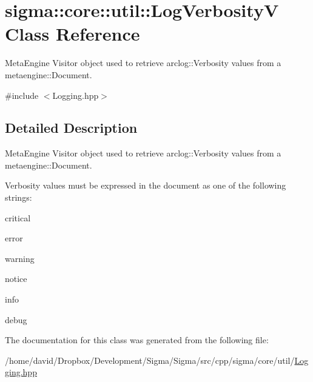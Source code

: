 \hypertarget{classsigma_1_1core_1_1util_1_1_log_verbosity_v}{\section{sigma\-:\-:core\-:\-:util\-:\-:Log\-Verbosity\-V Class Reference}
\label{classsigma_1_1core_1_1util_1_1_log_verbosity_v}
}


Meta\-Engine Visitor object used to retrieve arclog\-::\-Verbosity values from a metaengine\-::\-Document.  




{\ttfamily \#include $<$Logging.\-hpp$>$}



\subsection{Detailed Description}
Meta\-Engine Visitor object used to retrieve arclog\-::\-Verbosity values from a metaengine\-::\-Document. 

Verbosity values must be expressed in the document as one of the following strings\-:


\begin{DoxyItemize}
\item critical
\item error
\item warning
\item notice
\item info
\item debug 
\end{DoxyItemize}

The documentation for this class was generated from the following file\-:\begin{DoxyCompactItemize}
\item 
/home/david/\-Dropbox/\-Development/\-Sigma/\-Sigma/src/cpp/sigma/core/util/\hyperlink{_logging_8hpp}{Logging.\-hpp}\end{DoxyCompactItemize}
